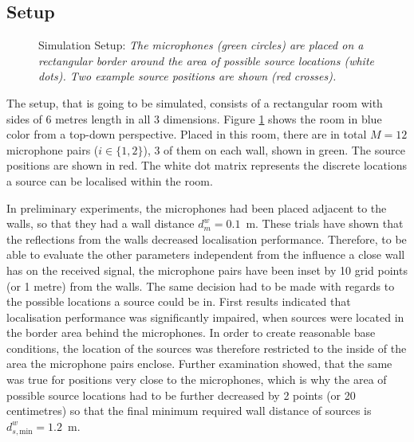 \subsection{Setup}
\label{sec:setup}

\begin{figure}[!htb]
\iftoggle{quick}{%
	\texttt{[image: plots/setup/setup-screenshot.png]}
}{%
	
}
	\caption[Simulation Setup]{Simulation Setup: \itshape The microphones (green circles) are placed on a rectangular border around the area of possible source locations (white dots). Two example source positions are shown (red crosses).}
	\label{fig:setup}
\end{figure}


The setup, that is going to be simulated, consists of a rectangular room with sides of 6 metres length in all 3 dimensions. Figure \ref{fig:setup} shows the room in blue color from a top-down perspective. Placed in this room, there are in total $M=12$ microphone pairs ($i\in\{1,2\}$), 3 of them on each wall, shown in green. The source positions are shown in red. The white dot matrix represents the discrete locations a source can be localised within the room.

In preliminary experiments, the microphones had been placed adjacent to the walls, so that they had a wall distance $d^w_{m}=0.1$~m. These trials have shown that the reflections from the walls decreased localisation performance. Therefore, to be able to evaluate the other parameters independent from the influence a close wall has on the received signal, the microphone pairs have been inset by 10 grid points (or 1 metre) from the walls. The same decision had to be made with regards to the possible locations a source could be in. First results indicated that localisation performance was significantly impaired, when sources were located in the border area behind the microphones. In order to create reasonable base conditions, the location of the sources was therefore restricted to the inside of the area the microphone pairs enclose. Further examination showed, that the same was true for positions very close to the microphones, which is why the area of possible source locations had to be further decreased by 2 points (or 20 centimetres) so that the final minimum required wall distance of sources is $d^w_{s,\text{min}}=1.2$~m.

